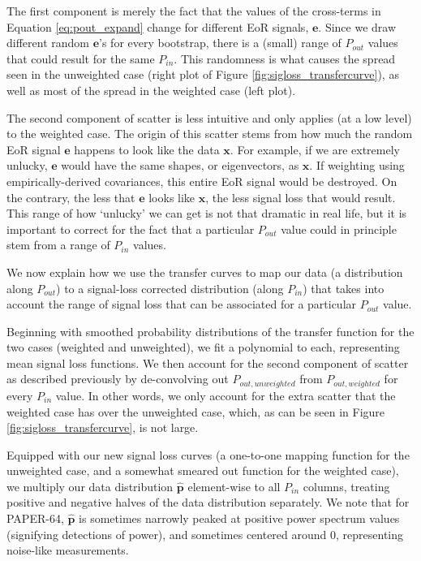 \documentclass[preprint2,numberedappendix,tighten]{aastex6}  %
\begin{document}
The first component is merely the fact that the values of the cross-terms in Equation \eqref{eq:pout_expand} change for different EoR signals, $\textbf{e}$. Since we draw different random $\textbf{e}$'s for every bootstrap, there is a (small) range of $P_{out}$ values that could result for the same $P_{in}$. This randomness is what causes the spread seen in the unweighted case (right plot of Figure \ref{fig:sigloss_transfercurve}), as well as most of the spread in the weighted case (left plot).

The second component of scatter is less intuitive and only applies (at a low level) to the weighted case. The origin of this scatter stems from how much the random EoR signal $\textbf{e}$ happens to look like the data $\textbf{x}$. For example, if we are extremely unlucky, $\textbf{e}$ would have the same shapes, or eigenvectors, as $\textbf{x}$. If weighting using empirically-derived covariances, this entire EoR signal would be destroyed. On the contrary, the less that $\textbf{e}$ looks like $\textbf{x}$, the less signal loss that would result. This range of how `unlucky' we can get is not that dramatic in real life, but it is important to correct for the fact that a particular $P_{out}$ value could in principle stem from a range of $P_{in}$ values. 

We now explain how we use the transfer curves to map our data (a distribution along $P_{out}$) to a signal-loss corrected distribution (along $P_{in}$) that takes into account the range of signal loss that can be associated for a particular $P_{out}$ value.

Beginning with smoothed probability distributions of the transfer function for the two cases (weighted and unweighted), we fit a polynomial to each, representing mean signal loss functions. We then account for the second component of scatter as described previously by de-convolving out $P_{out, unweighted}$ from $P_{out, weighted}$ for every $P_{in}$ value. In other words, we only account for the extra scatter that the weighted case has over the unweighted case, which, as can be seen in Figure \ref{fig:sigloss_transfercurve}, is not large.

Equipped with our new signal loss curves (a one-to-one mapping function for the unweighted case, and a somewhat smeared out function for the weighted case), we multiply our data distribution $\hat{\textbf{p}}$ element-wise to all $P_{in}$ columns, treating positive and negative halves of the data distribution separately. We note that for PAPER-64, $\hat{\textbf{p}}$ is sometimes narrowly peaked at positive power spectrum values (signifying detections of power), and sometimes centered around 0, representing noise-like measurements.
\end{document}
